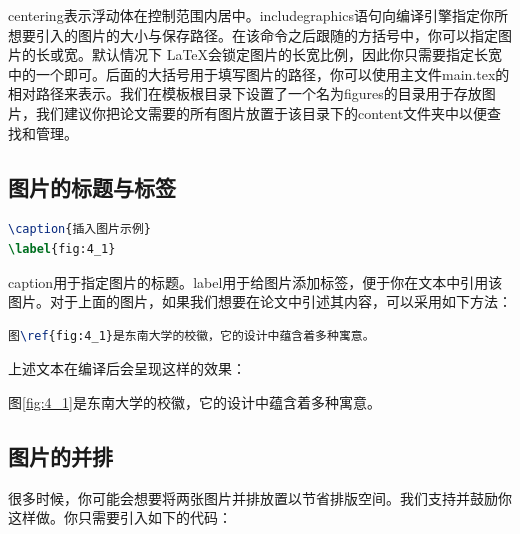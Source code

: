 {\codefont centering}表示浮动体在控制范围内居中。{\codefont includegraphics}语句向编译引擎指定你所想要引入的图片的大小与保存路径。在该命令之后跟随的方括号中，你可以指定图片的长或宽。默认情况下 \LaTeX 会锁定图片的长宽比例，因此你只需要指定长宽中的一个即可。后面的大括号用于填写图片的路径，你可以使用主文件main.tex的相对路径来表示。我们在模板根目录下设置了一个名为figures的目录用于存放图片，我们建议你把论文需要的所有图片放置于该目录下的content文件夹中以便查找和管理。

\subsection{图片的标题与标签}

\begin{tcolorbox}
\begin{lstlisting}[language=TeX]
\caption{插入图片示例}
\label{fig:4_1}
\end{lstlisting}
\end{tcolorbox}

{\codefont caption}用于指定图片的标题。{\codefont label}用于给图片添加标签，便于你在文本中引用该图片。对于上面的图片，如果我们想要在论文中引述其内容，可以采用如下方法：

\begin{tcolorbox}
\begin{lstlisting}[language=TeX]
图\ref{fig:4_1}是东南大学的校徽，它的设计中蕴含着多种寓意。
\end{lstlisting}
\end{tcolorbox}

\noindent 上述文本在编译后会呈现这样的效果：

图\ref{fig:4_1}是东南大学的校徽，它的设计中蕴含着多种寓意。

\subsection{图片的并排}

很多时候，你可能会想要将两张图片并排放置以节省排版空间。我们支持并鼓励你这样做。你只需要引入如下的代码：

